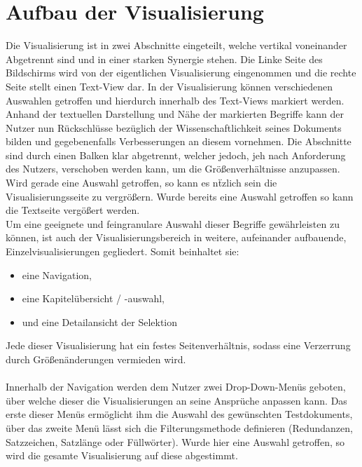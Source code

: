 \section{Aufbau der Visualisierung}
Die Visualisierung ist in zwei Abschnitte eingeteilt, welche vertikal voneinander Abgetrennt sind und in einer starken Synergie stehen. Die Linke Seite des Bildschirms wird von der eigentlichen Visualisierung eingenommen und die rechte Seite stellt einen Text-View dar. In der Visualisierung k\"onnen verschiedenen Auswahlen getroffen und hierdurch innerhalb des Text-Views markiert werden. Anhand der textuellen Darstellung und N\"ahe der markierten Begriffe kann der Nutzer nun R\"uckschl\"usse bez\"uglich der Wissenschaftlichkeit seines Dokuments bilden und gegebenenfalls Verbesserungen an diesem vornehmen. Die Abschnitte sind durch einen Balken klar abgetrennt, welcher jedoch, jeh nach Anforderung des Nutzers, verschoben werden kann, um die Gr\"o{\ss}enverh\"altnisse anzupassen. Wird gerade eine Auswahl getroffen, so kann es n\"tzlich sein die Visualisierungsseite zu vergr\"o{\ss}ern. Wurde bereits eine Auswahl getroffen so kann die Textseite verg\"o{\ss}ert werden.\\
Um eine geeignete und feingranulare Auswahl dieser Begriffe gew\"ahrleisten zu k\"onnen, ist auch der Visualisierungsbereich in weitere, aufeinander aufbauende, Einzelvisualisierungen gegliedert. Somit beinhaltet sie:
\begin{center} 
   \begin{varwidth}{2in} 
      \begin{itemize} 
         \item eine Navigation,
		 \item eine Kapitel\"ubersicht / -auswahl,
		 \item und eine Detailansicht der Selektion 
      \end{itemize} 
   \end{varwidth} 
\end{center} 
Jede dieser Visualisierung hat ein festes Seitenverh\"altnis, sodass eine Verzerrung durch Gr\"o{\ss}en\"anderungen vermieden wird.\\
\\
Innerhalb der Navigation werden dem Nutzer zwei Drop-Down-Men\"us geboten, \"uber welche dieser die Visualisierungen an seine Anspr\"uche anpassen kann. Das erste dieser Men\"us erm\"oglicht ihm die Auswahl des gew\"unschten Testdokuments, \"uber das zweite Men\"u l\"asst sich die Filterungsmethode definieren (Redundanzen, Satzzeichen, Satzl\"ange oder F\"ullw\"orter). Wurde hier eine Auswahl getroffen, so wird die gesamte Visualisierung auf diese abgestimmt.\\
